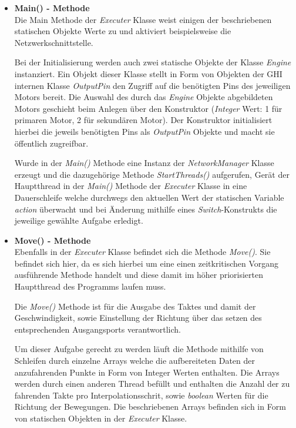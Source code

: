 \begin{itemize}
\item \textbf{Main() - Methode}\\
Die Main Methode der \textit{Executer} Klasse weist einigen der beschriebenen statischen Objekte Werte zu und aktiviert beispielsweise die Netzwerkschnittstelle.

Bei der Initialisierung werden auch zwei statische Objekte der Klasse \textit{Engine} instanziert. Ein Objekt dieser Klasse stellt in Form von Objekten der GHI internen Klasse \textit{OutputPin} den Zugriff auf die benötigten Pins des jeweiligen Motors bereit. Die Auswahl des durch das \textit{Engine} Objekte abgebildeten Motors geschieht beim Anlegen über den Konstruktor (\textit{Integer} Wert: 1 für primaren Motor, 2 für sekundären Motor). Der Konstruktor initialisiert hierbei die jeweils benötigten Pins als \textit{OutputPin} Objekte und macht sie öffentlich zugreifbar.

Wurde in der \textit{Main()} Methode eine Instanz der \textit{NetworkManager} Klasse erzeugt und die dazugehörige Methode \textit{StartThreads()} aufgerufen, Gerät der Hauptthread in der \textit{Main()} Methode der \textit{Executer} Klasse in eine Dauerschleife welche durchwegs den aktuellen Wert der statischen Variable \textit{action} überwacht und bei Änderung mithilfe eines \textit{Switch}-Konstrukts die jeweilige gewählte Aufgabe erledigt.

\item \textbf{Move() - Methode}\\

Ebenfalls in der \textit{Executer} Klasse befindet sich die Methode \textit{Move()}. Sie befindet sich hier, da es sich hierbei um eine einen zeitkritischen Vorgang ausführende Methode handelt und diese damit im höher priorisierten Hauptthread des Programms laufen muss.

Die \textit{Move()} Methode ist für die Ausgabe des Taktes und damit der Geschwindigkeit, sowie Einstellung der Richtung über das setzen des entsprechenden Ausgangsports verantwortlich.

Um dieser Aufgabe gerecht zu werden läuft die Methode mithilfe von Schleifen durch einzelne Arrays welche die aufbereiteten Daten der anzufahrenden Punkte in Form von Integer Werten enthalten. Die Arrays werden durch einen anderen Thread befüllt und enthalten die Anzahl der zu fahrenden Takte pro Interpolationsschrit, sowie \textit{boolean} Werten für die Richtung der Bewegungen.
Die beschriebenen Arrays befinden sich in Form von statischen Objekten in der \textit{Executer} Klasse.


\end{itemize}
